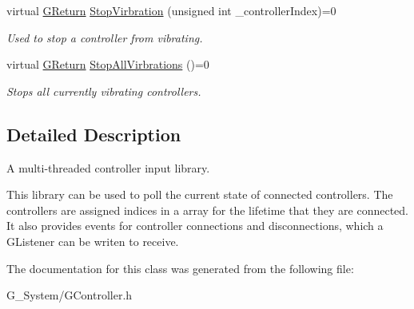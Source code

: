 \begin{DoxyCompactItemize}
\mbox{\label{class_g_w_1_1_s_y_s_t_e_m_1_1_g_controller_a2d1451549619519089a31ab6a075cb09}} 
virtual \mbox{\hyperlink{namespace_g_w_a67a839e3df7ea8a5c5686613a7a3de21}{G\+Return}} \mbox{\hyperlink{class_g_w_1_1_s_y_s_t_e_m_1_1_g_controller_a2d1451549619519089a31ab6a075cb09}{Stop\+Virbration}} (unsigned int \+\_\+controller\+Index)=0
\begin{DoxyCompactList}\small\item\em Used to stop a controller from vibrating. \end{DoxyCompactList}\item 
\mbox{\label{class_g_w_1_1_s_y_s_t_e_m_1_1_g_controller_aea5a523d30ebedb5d9923d61d77f1583}} 
virtual \mbox{\hyperlink{namespace_g_w_a67a839e3df7ea8a5c5686613a7a3de21}{G\+Return}} \mbox{\hyperlink{class_g_w_1_1_s_y_s_t_e_m_1_1_g_controller_aea5a523d30ebedb5d9923d61d77f1583}{Stop\+All\+Virbrations}} ()=0
\begin{DoxyCompactList}\small\item\em Stops all currently vibrating controllers. \end{DoxyCompactList}\end{DoxyCompactItemize}


\subsection{Detailed Description}
A multi-\/threaded controller input library. 

This library can be used to poll the current state of connected controllers. The controllers are assigned indices in a array for the lifetime that they are connected. It also provides events for controller connections and disconnections, which a G\+Listener can be writen to receive. 

The documentation for this class was generated from the following file\+:\begin{DoxyCompactItemize}
\item 
G\+\_\+\+System/G\+Controller.\+h\end{DoxyCompactItemize}
